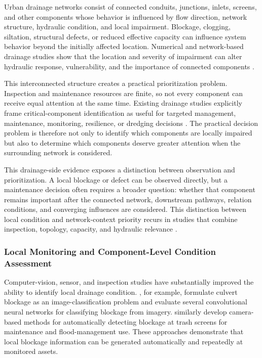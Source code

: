 Urban drainage networks consist of connected conduits, junctions,
inlets, screens, and other components whose behavior is influenced by
flow direction, network structure, hydraulic condition, and local
impairment. Blockage, clogging, siltation, structural defects, or
reduced effective capacity can influence system behavior beyond the
initially affected location. Numerical and network-based drainage
studies show that the location and severity of impairment can alter
hydraulic response, vulnerability, and the importance of connected
components \citep{simone2022,simone2023,reyes2020,dastgir2023,dastgir2024,meijer2023,zhang2025}.

This interconnected structure creates a practical prioritization
problem. Inspection and maintenance resources are finite, so not every
component can receive equal attention at the same time. Existing
drainage studies explicitly frame critical-component identification as
useful for targeted management, maintenance, monitoring, resilience, or
dredging decisions \citep{simone2022,simone2023,dastgir2023,dastgir2024,meijer2023,zhang2025}. The practical
decision problem is therefore not only to identify which components are
locally impaired but also to determine which components deserve greater
attention when the surrounding network is considered.

This drainage-side evidence exposes a distinction between observation
and prioritization. A local
blockage or defect can be observed directly, but a maintenance decision
often requires a broader question: whether that component remains
important after the connected network, downstream pathways, relation
conditions, and converging influences are considered. This distinction
between local condition and network-context priority recurs in studies
that combine inspection, topology, capacity, and hydraulic relevance
\citep{simone2022,simone2023,dastgir2023,meijer2023,zhang2025}.

\subsubsection{Local Monitoring and Component-Level Condition
Assessment}\label{local-monitoring-and-component-level-condition-assessment}

Computer-vision, sensor, and inspection studies have substantially
improved the ability to identify local drainage condition. \citet{iqbal2021}, for example, formulate culvert blockage as an
image-classification problem and evaluate several convolutional neural
networks for classifying blockage from imagery. \citet{vandaele2024}
similarly develop camera-based methods for automatically detecting
blockage at trash screens for maintenance and flood-management use.
These approaches demonstrate that local blockage information can be
generated automatically and repeatedly at monitored assets.

